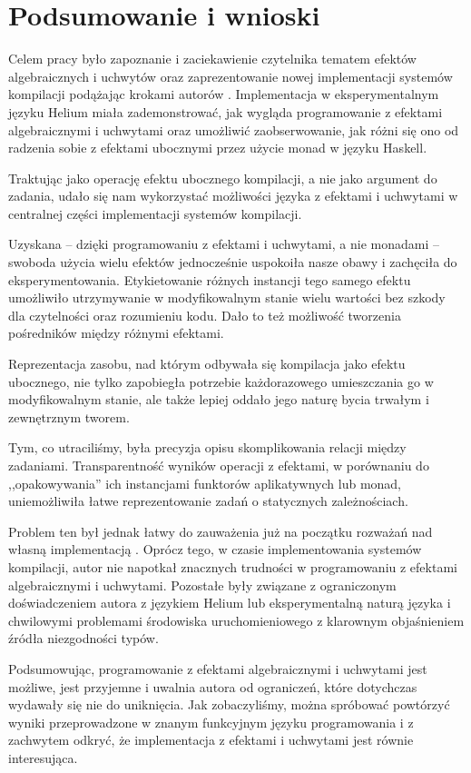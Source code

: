 
\chapter{Podsumowanie i wnioski}

Celem pracy było zapoznanie i zaciekawienie czytelnika tematem efektów algebraicznych i uchwytów oraz zaprezentowanie nowej implementacji systemów kompilacji podążając krokami autorów \BSaLC{}. Implementacja w eksperymentalnym języku Helium miała zademonstrować, jak wygląda programowanie z efektami algebraicznymi i uchwytami oraz umożliwić zaobserwowanie, jak różni się ono od radzenia sobie z efektami ubocznymi przez użycie monad w języku Haskell.

Traktując  jako operację efektu ubocznego kompilacji, a nie jako argument do zadania, udało się nam wykorzystać możliwości języka z efektami i uchwytami w centralnej części implementacji systemów kompilacji.

Uzyskana -- dzięki programowaniu z efektami i uchwytami, a nie monadami -- swoboda użycia wielu efektów jednocześnie uspokoiła nasze obawy i zachęciła do eksperymentowania. Etykietowanie różnych instancji tego samego efektu umożliwiło utrzymywanie w modyfikowalnym stanie wielu wartości bez szkody dla czytelności oraz rozumieniu kodu. Dało to też możliwość tworzenia pośredników między różnymi efektami. %

Reprezentacja zasobu, nad którym odbywała się kompilacja jako efektu ubocznego, nie tylko zapobiegła potrzebie każdorazowego umieszczania go w modyfikowalnym stanie, ale także lepiej oddało jego naturę bycia trwałym i zewnętrznym tworem.

Tym, co utraciliśmy, była precyzja opisu skomplikowania relacji między zadaniami. Transparentność wyników operacji z efektami, w porównaniu do ,,opakowywania'' ich instancjami funktorów aplikatywnych lub monad, uniemożliwiła łatwe reprezentowanie zadań o statycznych zależnościach.

Problem ten był jednak łatwy do zauważenia już na początku rozważań nad własną implementacją \BSaLC{}. Oprócz tego, w czasie implementowania systemów kompilacji, autor nie napotkał znacznych trudności w programowaniu z efektami algebraicznymi i uchwytami. Pozostałe były związane z ograniczonym doświadczeniem autora z językiem Helium lub eksperymentalną naturą języka i chwilowymi problemami środowiska uruchomieniowego z klarownym objaśnieniem źródła niezgodności typów.

Podsumowując, programowanie z efektami algebraicznymi i uchwytami jest możliwe, jest przyjemne i uwalnia autora od ograniczeń, które dotychczas wydawały się nie do uniknięcia. Jak zobaczyliśmy, można spróbować powtórzyć wyniki przeprowadzone w znanym funkcyjnym języku programowania i z zachwytem odkryć, że implementacja z efektami i uchwytami jest równie interesująca.
